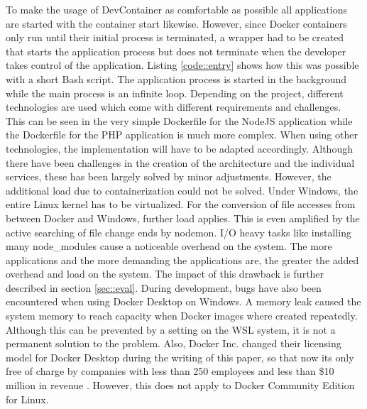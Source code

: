         To make the usage of DevContainer as comfortable as possible all applications are started with the container start likewise. However, since Docker containers only run until their initial process is terminated, a wrapper had to be created that starts the application process but does not terminate when the developer takes control of the application. Listing \ref{code::entry} shows how this was possible with a short Bash script. The application process is started in the background while the main process is an infinite loop. \newline
        Depending on the project, different technologies are used which come with different requirements and challenges. This can be seen in the very simple Dockerfile for the NodeJS application while the Dockerfile for the PHP application is much more complex. When using other technologies, the implementation will have to be adapted accordingly.\newline
        Although there have been challenges in the creation of the architecture and the individual services, these has been largely solved by minor adjustments. However, the additional load due to containerization could not be solved. Under Windows, the entire Linux kernel has to be virtualized. For the conversion of file accesses from between Docker and Windows, further load applies. This is even amplified by the active searching of file change ends by nodemon. \acs{I/O} heavy tasks like installing many node\_modules cause a noticeable overhead on the system. The more applications and the more demanding the applications are, the greater the added overhead and load on the system. The impact of this drawback is further described in section \ref{sec::eval}. \newline
        During development, bugs have also been encountered when using Docker Desktop on Windows. A memory leak caused the system memory to reach capacity when Docker images where created repeatedly. Although this can be prevented by a setting on the \ac{WSL} system, it is not a permanent solution to the problem. Also, Docker Inc. changed their licensing model for Docker Desktop during the writing of this paper, so that now its only free of charge by companies with less than 250 employees and less than \$10 million in revenue \cite{dockerblog}. However, this does not apply to Docker Community Edition for Linux.

